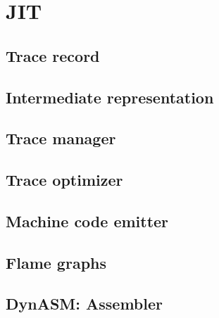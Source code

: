 \documentclass[12pt, oneside]{Thesis}
\begin{document}
\part{JIT}
\label{Part:JIT}

  \chapter{Trace record}
  \label{Chapt:TR}
  

  \chapter{Intermediate representation}
  \label{Chapt:IR}
  

  \chapter{Trace manager}
  \label{Chapt:TM}
  

  \chapter{Trace optimizer}
  \label{Chapt:TO}
  

  \chapter{Machine code emitter}
  \label{Chapt:mcode}
\clearpage
{}
\appendix
\baselineskip=16pt

\chapter{Flame graphs}
\label{Apendix:fl}


\chapter{DynASM: Assembler}
\label{Apendix:DynASM}



\backmatter


\label{Bibliography}

\renewcommand{\bibname}{References}


\end{document}
